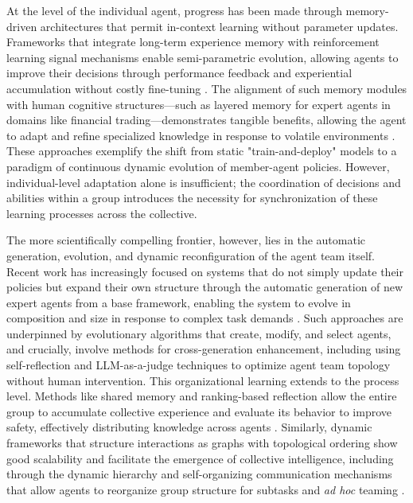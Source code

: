 \documentclass[11pt,a4paper]{article}
\begin{document}
At the level of the individual agent, progress has been made through memory-driven architectures that permit in-context learning without parameter updates. Frameworks that integrate long-term experience memory with reinforcement learning signal mechanisms enable semi-parametric evolution, allowing agents to improve their decisions through performance feedback and experiential accumulation without costly fine-tuning \cite{arxiv:2306.07929v2}. The alignment of such memory modules with human cognitive structures---such as layered memory for expert agents in domains like financial trading---demonstrates tangible benefits, allowing the agent to adapt and refine specialized knowledge in response to volatile environments \cite{arxiv:2311.13743v2}. These approaches exemplify the shift from static "train-and-deploy" models to a paradigm of continuous dynamic evolution of member-agent policies. However, individual-level adaptation alone is insufficient; the coordination of decisions and abilities within a group introduces the necessity for synchronization of these learning processes across the collective.

The more scientifically compelling frontier, however, lies in the automatic generation, evolution, and dynamic reconfiguration of the agent team itself. Recent work has increasingly focused on systems that do not simply update their policies but expand their own structure through the automatic generation of new expert agents from a base framework, enabling the system to evolve in composition and size in response to complex task demands \cite{arxiv:2403.12482v1}. Such approaches are underpinned by evolutionary algorithms that create, modify, and select agents, and crucially, involve methods for cross-generation enhancement, including using self-reflection and LLM-as-a-judge techniques to optimize agent team topology without human intervention. This organizational learning extends to the process level. Methods like shared memory and ranking-based reflection allow the entire group to accumulate collective experience and evaluate its behavior to improve safety, effectively distributing knowledge across agents \cite{arxiv:2407.14239v1}. Similarly, dynamic frameworks that structure interactions as graphs with topological ordering show good scalability and facilitate the emergence of collective intelligence, including through the dynamic hierarchy and self-organizing communication mechanisms that allow agents to reorganize group structure for subtasks and \emph{ad hoc} teaming \cite{arxiv:2406.07155v1,arxiv:2403.08282v2}.
\end{document}
